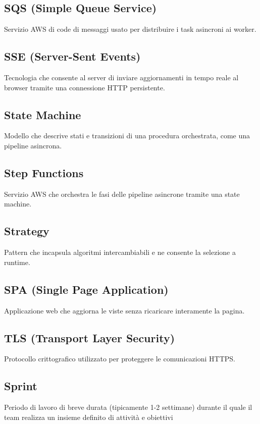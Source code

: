 \documentclass[a4paper,12pt]{article}
\begin{document}
\subsection{SQS (Simple Queue Service)}
Servizio AWS di code di messaggi usato per distribuire i task asincroni ai worker.

\subsection{SSE (Server-Sent Events)}
Tecnologia che consente al server di inviare aggiornamenti in tempo reale al browser tramite una connessione HTTP persistente.

\subsection{State Machine}
Modello che descrive stati e transizioni di una procedura orchestrata, come una pipeline asincrona.

\subsection{Step Functions}
Servizio AWS che orchestra le fasi delle pipeline asincrone tramite una state machine.

\subsection{Strategy}
Pattern che incapsula algoritmi intercambiabili e ne consente la selezione a runtime.

\subsection{SPA (Single Page Application)}
Applicazione web che aggiorna le viste senza ricaricare interamente la pagina.

\subsection{TLS (Transport Layer Security)}
Protocollo crittografico utilizzato per proteggere le comunicazioni HTTPS.

\subsection{Sprint}
Periodo di lavoro di breve durata (tipicamente 1-2 settimane) durante il quale il team realizza un insieme definito di attività e obiettivi
\end{document}
